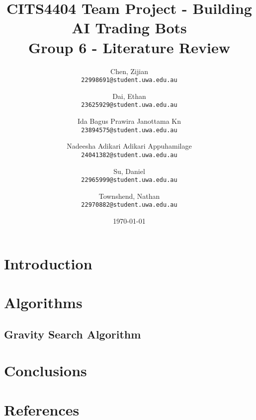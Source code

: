 \documentclass{article}
\title{
    CITS4404 Team Project - Building AI Trading Bots
    \\ \large Group 6 - Literature Review
}
\author{
    Chen, Zijian\\
    \texttt{22998691@student.uwa.edu.au}
    \and
    Dai, Ethan\\
    \texttt{23625929@student.uwa.edu.au}
    \and
    Ida Bagus Prawira Janottama Kn\\
    \texttt{23894575@student.uwa.edu.au}
    \and
    Nadeesha Adikari Adikari Appuhamilage\\
    \texttt{24041382@student.uwa.edu.au}
    \and
    Su, Daniel\\
    \texttt{22965999@student.uwa.edu.au}
    \and
    Townshend, Nathan\\
    \texttt{22970882@student.uwa.edu.au}
}
\date{\today}
\begin{document}
\clearpage

\maketitle


\newpage
\tableofcontents


\newpage
\section{Introduction}\label{sec:intro}
% 


\newpage
\section{Algorithms}\label{sec:alg}

\subsection{Gravity Search Algorithm}\label{sec:alg:gsa}



\newpage
\section{Conclusions}\label{sec:conc}
% 


\newpage
{}
\section{References}
\vspace{-24pt}
\renewcommand{\refname}{}


\end{document}
